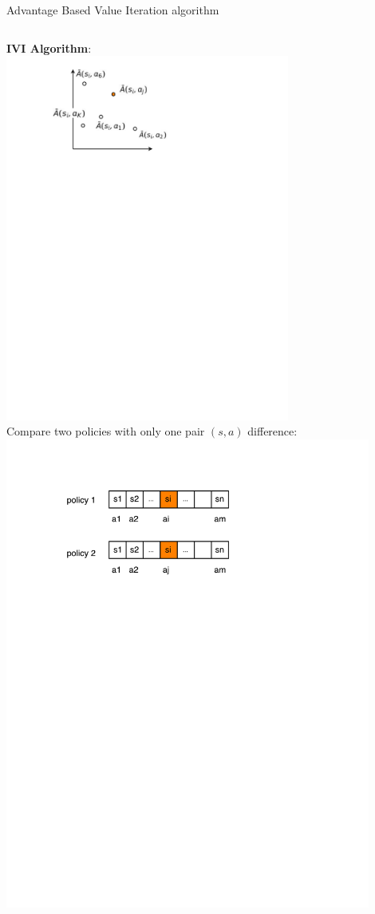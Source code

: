 \documentclass{beamer}
\newcommand\Fontvi{\fontsize{9}{10.2}\selectfont}
\begin{document}
\begin{frame}[plain]
{Advantage Based Value Iteration algorithm}
\Fontvi
\begin{columns}
\begin{column}{.48\textwidth}
\textbf{IVI Algorithm}: ~\\
\includegraphics[width = 0.7\textwidth]{figures-new/adv-tree} ~\\
Compare two policies with {\color{red} only one} pair $(s,a)$ difference: ~\\
\includegraphics[width = 0.9\textwidth]{figures-new/improv} ~\\

\end{column}
\end{columns}
\end{frame}
\end{document}
